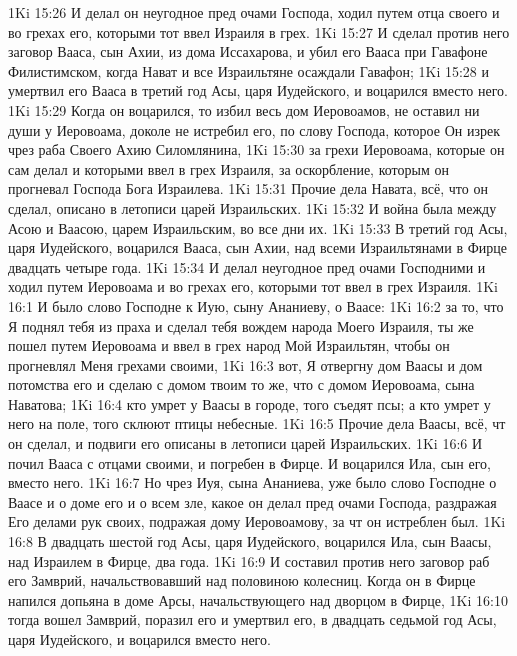 \vs 1Ki 15:26 И делал он неугодное пред очами Господа, ходил путем отца своего и во грехах его, которыми тот ввел Израиля в грех.
\vs 1Ki 15:27 И сделал против него заговор Вааса, сын Ахии, из дома Иссахарова, и убил его Вааса при Гавафоне Филистимском, когда Нават и все Израильтяне осаждали Гавафон;
\vs 1Ki 15:28 и умертвил его Вааса в третий год Асы, царя Иудейского, и воцарился вместо него.
\vs 1Ki 15:29 Когда он воцарился, то избил весь дом Иеровоамов, не оставил ни души у Иеровоама, доколе не истребил его, по слову Господа, которое Он изрек чрез раба Своего Ахию Силомлянина,
\vs 1Ki 15:30 за грехи Иеровоама, которые он сам делал и которыми ввел в грех Израиля, за оскорбление, которым он прогневал Господа Бога Израилева.
\rsbpar\vs 1Ki 15:31 Прочие дела Навата, всё, что он сделал, описано в летописи царей Израильских.
\vs 1Ki 15:32 И война была между Асою и Ваасою, царем Израильским, во все дни их.
\rsbpar\vs 1Ki 15:33 В третий год Асы, царя Иудейского, воцарился Вааса, сын Ахии, над всеми Израильтянами в Фирце  двадцать четыре года.
\vs 1Ki 15:34 И делал неугодное пред очами Господними и ходил путем Иеровоама и во грехах его, которыми тот ввел в грех Израиля.
\vs 1Ki 16:1 И было слово Господне к Иую, сыну Ананиеву, о Ваасе:
\vs 1Ki 16:2 за то, что Я поднял тебя из праха и сделал тебя вождем народа Моего Израиля, ты же пошел путем Иеровоама и ввел в грех народ Мой Израильтян, чтобы он прогневлял Меня грехами своими,
\vs 1Ki 16:3 вот, Я отвергну дом Ваасы и дом потомства его и сделаю с домом твоим то же, что с домом Иеровоама, сына Наватова;
\vs 1Ki 16:4 кто умрет у Ваасы в городе, того съедят псы; а кто умрет у него на поле, того склюют птицы небесные.
\rsbpar\vs 1Ki 16:5 Прочие дела Ваасы, всё, чт он сделал, и подвиги его описаны в летописи царей Израильских.
\vs 1Ki 16:6 И почил Вааса с отцами своими, и погребен в Фирце. И воцарился Ила, сын его, вместо него.
\vs 1Ki 16:7 Но чрез Иуя, сына Ананиева, уже было  слово Господне о Ваасе и о доме его и о всем зле, какое он делал пред очами Господа, раздражая Его делами рук своих, подражая дому Иеровоамову, за чт он истреблен был.
\rsbpar\vs 1Ki 16:8 В двадцать шестой год Асы, царя Иудейского, воцарился Ила, сын Ваасы, над Израилем в Фирце,  два года.
\vs 1Ki 16:9 И составил против него заговор раб его Замврий, начальствовавший над половиною колесниц. Когда он в Фирце напился допьяна в доме Арсы, начальствующего над дворцом в Фирце,
\vs 1Ki 16:10 тогда вошел Замврий, поразил его и умертвил его, в двадцать седьмой год Асы, царя Иудейского, и воцарился вместо него.
